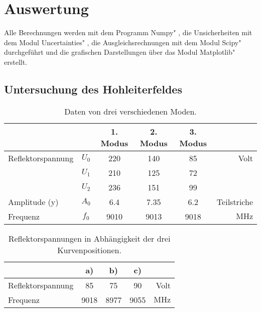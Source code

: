 \section{Auswertung}
\label{sec:Auswertung}
Alle Berechnungen werden mit dem Programm \glqq Numpy" \cite{numpy}, die Unsicherheiten mit dem Modul \glqq Uncertainties" \cite{uncertainties}, die Ausgleichsrechnungen mit dem Modul \glqq Scipy" \cite{scipy} durchgeführt und die grafischen Darstellungen über das Modul \glqq Matplotlib" \cite{matplotlib} erstellt.


\subsection{Untersuchung des Hohleiterfeldes}





\begin{table}
    \centering
    \caption{Daten von drei verschiedenen Moden.}
    \label{tab:mod}
    \renewcommand{\arraystretch}{2} 
    \begin{tabular}{|l c| c| c| c| r|}
        \hline
         & & 1. Modus & 2. Modus & 3. Modus & \\
        \hline
        Reflektorspannung & $U_0$ & 220 & 140 & 85 & Volt \\
         & $U_1$ & 210 & 125 & 72 & \\
         & $U_2$ &  236 & 151 & 99 & \\
        Amplitude (y) & $A_0$ & 6.4 & 7.35 & 6.2 & Teilstriche \\
        Frequenz & $f_0$ & 9010 & 9013 & 9018 & $\si{\mega\hertz}$\\

        \hline

    \end{tabular}
    \renewcommand{\arraystretch}{1} 
\end{table}

\begin{table}
    \centering
    \caption{Reflektorspannungen in Abhängigkeit der drei Kurvenpositionen.}
    \label{tab:elek}
    \renewcommand{\arraystretch}{2} 
    \begin{tabular}{|l |  c| c| c| r|}
        \hline
         &  a) & b) & c) & \\
        \hline
        Reflektorspannung &  85 & 75 & 90 & Volt \\

        Frequenz & 9018 & 8977 & 9055 & $\si{\mega\hertz}$\\

        \hline

    \end{tabular}
    \renewcommand{\arraystretch}{1} 
\end{table}

